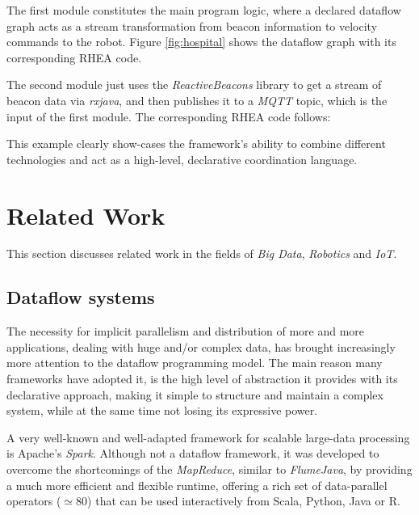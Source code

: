\documentclass[sigplan,review,anonymous]{acmart}
\begin{document}
The first module constitutes the main program logic, where a declared dataflow
graph acts as a stream transformation from beacon information to velocity
commands to the robot. Figure \ref{fig:hospital} shows the dataflow graph with
its corresponding \textsc{RHEA} code.


The second module just uses the \textit{ReactiveBeacons}
library to get a stream of
beacon data via \textit{rxjava}, and then publishes it to a \textit{MQTT} topic,
which is the input of the first module. The corresponding \textsc{RHEA} code
follows:

This example clearly show-cases the framework's ability to combine different
technologies and act as a high-level, declarative coordination language.

\section{Related Work} \label{sec:related}

This section discusses related work in the fields of \textit{Big Data},
\textit{Robotics} and \textit{IoT}.

\subsection{Dataflow systems}

The necessity for implicit parallelism and distribution of more and more
applications, dealing with huge and/or complex data, has brought increasingly
more attention to the dataflow programming model. The main reason many
frameworks have adopted it, is the high level of abstraction it provides with
its declarative approach, making it simple to structure and maintain a complex
system, while at the same time not losing its expressive power.

A very well-known and well-adapted framework for scalable large-data processing
is Apache's \textit{Spark}. Although not a
dataflow framework, it was developed to overcome the shortcomings of the
\textit{MapReduce}, similar to \textit{FlumeJava}, by providing a much more
efficient and flexible runtime, offering a rich set of data-parallel operators ($\simeq 80$)
that can be used interactively from Scala, Python, Java or R.
\end{document}
